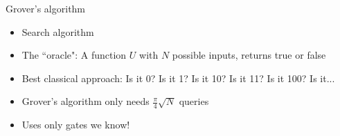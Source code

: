 \documentclass[14pt]{beamer}
\begin{document}

\begin{frame}{Grover's algorithm}
\begin{itemize}
	\item Search algorithm
	\item The ``oracle": A function $U$ with $N$ possible inputs, returns true or false
	\item Best classical approach: Is it 0? Is it 1? Is it 10? Is it 11? Is it 100? Is it...
	\item Grover's algorithm only needs $\frac{\pi}{4}\sqrt{N}$ queries
	\item Uses only gates we know!
\end{itemize}
\end{frame}
\end{document}

